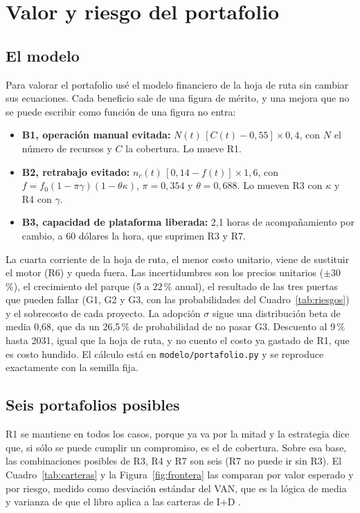 \documentclass[11pt,letterpaper]{article}
\newcommand{\pct}{\,\%}
\begin{document}
\section{Valor y riesgo del portafolio}
\label{sec:valor}

\subsection*{El modelo}

Para valorar el portafolio usé el modelo financiero de la hoja de ruta sin
cambiar sus ecuaciones. Cada beneficio sale de una figura de mérito, y una
mejora que no se puede escribir como función de una figura no entra:

\begin{itemize}
\item \textbf{B1, operación manual evitada:} $N(t)\,[C(t) - 0{,}55]\times 0{,}4$,
  con $N$ el número de recursos y $C$ la cobertura. Lo mueve R1.
\item \textbf{B2, retrabajo evitado:} $n_c(t)\,[0{,}14 - f(t)]\times 1{,}6$,
  con $f = f_0(1-\pi\gamma)(1-\theta\kappa)$, $\pi = 0{,}354$ y
  $\theta = 0{,}688$. Lo mueven R3 con $\kappa$ y R4 con $\gamma$.
\item \textbf{B3, capacidad de plataforma liberada:} 2,1 horas de acompañamiento
  por cambio, a 60 dólares la hora, que suprimen R3 y R7.
\end{itemize}

La cuarta corriente de la hoja de ruta, el menor costo unitario, viene de
sustituir el motor (R6) y queda fuera. Las incertidumbres son los precios
unitarios ($\pm 30$\pct), el crecimiento del parque (5 a 22\pct{} anual), el
resultado de las tres puertas que pueden fallar (G1, G2 y G3, con las
probabilidades del Cuadro~\ref{tab:riesgos}) y el sobrecosto de cada proyecto.
La adopción $\sigma$ sigue una distribución beta de media 0,68, que da un
26,5\pct{} de probabilidad de no pasar G3. Descuento al 9\pct{} hasta 2031,
igual que la hoja de ruta, y no cuento el costo ya gastado de R1, que es costo
hundido. El cálculo está en \texttt{modelo/portafolio.py} y se reproduce
exactamente con la semilla fija.

\subsection*{Seis portafolios posibles}

R1 se mantiene en todos los casos, porque ya va por la mitad y la estrategia
dice que, si sólo se puede cumplir un compromiso, es el de cobertura. Sobre esa
base, las combinaciones posibles de R3, R4 y R7 son seis (R7 no puede ir sin
R3). El Cuadro~\ref{tab:carteras} y la Figura~\ref{fig:frontera} las comparan
por valor esperado y por riesgo, medido como desviación estándar del VAN, que
es la lógica de media y varianza de \textcite{markowitz1952} que el libro aplica
a las carteras de I+D \autocite[sec.~16.5]{deweck2022}.
\end{document}
